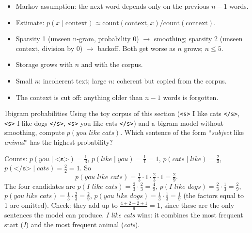 \begin{nbsummary}
\begin{itemize}[nosep]
  \item Markov assumption: the next word depends only on the previous $n-1$ words.
  \item Estimate: $p(x \mid \text{context}) \approx
        \text{count}(\text{context}, x) / \text{count}(\text{context})$.
  \item Sparsity 1 (unseen n-gram, probability 0) $\to$ smoothing; sparsity 2 (unseen
        context, division by 0) $\to$ backoff. Both get worse as $n$ grows; $n \le 5$.
  \item Storage grows with $n$ and with the corpus.
  \item Small $n$: incoherent text; large $n$: coherent but copied from the corpus.
  \item The context is cut off: anything older than $n-1$ words is forgotten.
\end{itemize}
\end{nbsummary}

\begin{nbexercise}{1}{bigram probabilities}
\notinslides
Using the toy corpus of this section (\texttt{<s>} I like cats \texttt{</s>},
\texttt{<s>} I like dogs \texttt{</s>}, \texttt{<s>} you like cats \texttt{</s>}) and a
bigram model without smoothing, compute $p(\textit{you like cats})$. Which sentence of
the form ``\emph{subject} like \emph{animal}'' has the highest probability?
\end{nbexercise}
\begin{nbsolution}
Counts: $p(\textit{you} \mid \texttt{<s>}) = \frac13$,
$p(\textit{like} \mid \textit{you}) = \frac11 = 1$,
$p(\textit{cats} \mid \textit{like}) = \frac23$,
$p(\texttt{</s>} \mid \textit{cats}) = \frac22 = 1$. So
\[
  p(\textit{you like cats}) = \tfrac13 \cdot 1 \cdot \tfrac23 \cdot 1 = \tfrac29 .
\]
The four candidates are
$p(\textit{I like cats}) = \frac23 \cdot \frac23 = \frac49$,
$p(\textit{I like dogs}) = \frac23 \cdot \frac13 = \frac29$,
$p(\textit{you like cats}) = \frac13 \cdot \frac23 = \frac29$,
$p(\textit{you like dogs}) = \frac13 \cdot \frac13 = \frac19$ (the factors equal to 1
are omitted). Check: they add up to $\frac{4+2+2+1}{9} = 1$, since these are the only
sentences the model can produce. \emph{I like cats} wins: it combines the most
frequent start (\emph{I}) and the most frequent animal (\emph{cats}).
\end{nbsolution}
